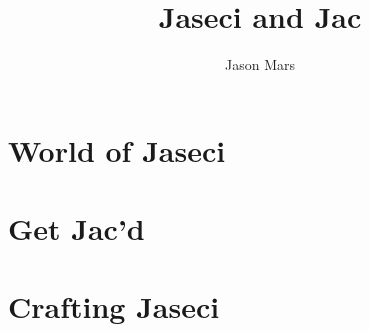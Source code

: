 \documentclass{book}
\title{Jaseci and Jac}
\author{Jason Mars}
\begin{document}








\part{World of Jaseci}
\label{part:jsword}








\part{Get Jac'd}
\label{part:jacd}


\part{Crafting Jaseci}
\label{part:crafting}






\appendix







\end{document}
